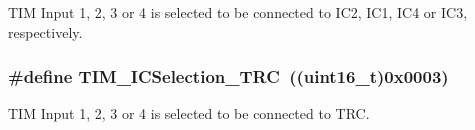 \label{group__TIM__Input__Capture__Selection_ga2289b684133ac0b81ddfcd860d01b144}
TIM Input 1, 2, 3 or 4 is selected to be connected to IC2, IC1, IC4 or IC3, respectively. \hypertarget{group__TIM__Input__Capture__Selection_ga2cd464e97ffd6ea3208ec65672f9a373}{
\subsubsection[{TIM\_\-ICSelection\_\-TRC}]{\setlength{\rightskip}{0pt plus 5cm}\#define TIM\_\-ICSelection\_\-TRC~((uint16\_\-t)0x0003)}}
\label{group__TIM__Input__Capture__Selection_ga2cd464e97ffd6ea3208ec65672f9a373}
TIM Input 1, 2, 3 or 4 is selected to be connected to TRC. 